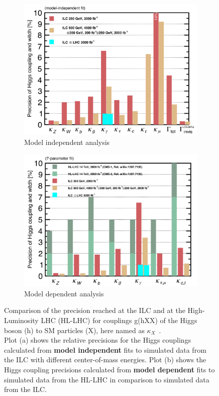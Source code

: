 \begin{figure}[h]
 \centering
  \begin{subfigure}[b]{0.49\textwidth}
   \centering
    \includegraphics[width=\textwidth]{Figures/Higgs_couplings_modelindependent.png}
   \caption{Model independent analysis}
   \end{subfigure}
   \hfill
    \begin{subfigure}[b]{0.49\textwidth}
   \centering
    \includegraphics[width=\textwidth]{Figures/Higgs_couplings_modeldependent.png}
   \caption{Model dependent analysis}
   \end{subfigure}
   \caption[Higgs coupling precisions]{Comparison of the precision reached at the ILC and at the High-Luminosity LHC (HL-LHC) for couplings g(hXX) of the Higgs boson (h) to SM particles (X), here named as $\kappa_X$~\cite{HiggsCouplings_Junping}.\\
   Plot (a) shows the relative precisions for the Higgs couplings calculated from \textbf{model independent} fits to simulated data from the ILC with different center-of-mass energies.
   Plot (b) shows the Higgs coupling precisions calculated from \textbf{model dependent} fits to simulated data from the HL-LHC in comparison to simulated data from the ILC.}
   \label{fig:Higgs_couplings}
 \end{figure}

